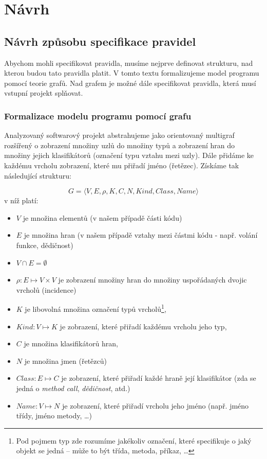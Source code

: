 \chapter{Návrh}

\section{Návrh způsobu specifikace pravidel}

Abychom mohli specifikovat pravidla, musíme nejprve definovat strukturu, nad kterou budou tato pravidla platit. V tomto textu formalizujeme model programu pomocí teorie grafů. Nad grafem je možné dále specifikovat pravidla, která musí vstupní projekt splňovat.

\subsection{Formalizace modelu programu pomocí grafu}
\label{design-graph_formalization}

Analyzovaný softwarový projekt abstrahujeme jako orientovaný multigraf rozšířený o zobrazení množiny uzlů do množiny typů a zobrazení hran do množiny jejich klasifikátorů (označení typu vztahu mezi uzly). Dále přidáme ke každému vrcholu zobrazení, které mu přiřadí jméno (řetězec). Získáme tak následující strukturu:

\begin{displaymath}
  G = \langle V, E, \rho, K, C, N, \mathit{Kind}, \mathit{Class}, \mathit{Name}\rangle
  \label{extended_multigraph}
\end{displaymath}
v níž platí:
\begin{itemize}
\item $V$ je množina elementů (v našem případě části kódu)
\item $E$ je množina hran (v našem případě vztahy mezi částmi kódu - např. volání funkce, dědičnost)
\item $V \cap E = \emptyset$
\item $\rho: E \mapsto V \times V$ je zobrazení množiny hran do množiny uspořádaných dvojic vrcholů (incidence)
\item $K$ je libovolná množina označení typů vrcholů\footnote{Pod pojmem typ zde rozumíme jakékoliv označení, které specifikuje o jaký objekt se jedná -- může to být třída, metoda, příkaz, \ldots},
\item $\mathit{Kind}: V \mapsto K$ je zobrazení, které přiřadí každému vrcholu jeho typ,
\item $C$ je množina klasifikátorů hran,
\item $N$ je množina jmen (řetězců)
\item $\mathit{Class}: E \mapsto C$ je zobrazení, které přiřadí každé hraně její klasifikátor (zda se jedná o \emph{method call}, \emph{dědičnost}, atd.)
\item $\mathit{Name}: V \mapsto N$ je zobrazení, které přiřadí vrcholu jeho jméno (např. jméno třídy, jméno metody, \ldots)
\end{itemize}

